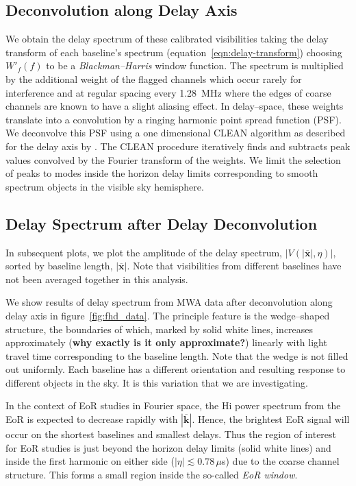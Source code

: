 \documentclass[preprint2,iop,numberedappendix]{emulateapj}
\begin{document}
\subsection{Deconvolution along Delay Axis}\label{sec:CLEAN}

We obtain the delay spectrum of these calibrated visibilities taking the delay transform of each baseline's spectrum (equation~\ref{eqn:delay-transform}) choosing $W'_f(f)$ to be a {\it Blackman--Harris} window function. The spectrum is multiplied by  the additional weight of the flagged channels which occur rarely for interference and at regular spacing every 1.28~MHz where the edges of coarse channels are known to have a slight aliasing effect. In delay--space, these weights translate into a convolution by a ringing harmonic point spread function (PSF). We deconvolve this PSF using a one dimensional CLEAN algorithm \citep{tay99} as described for the delay axis by \citet{par09,par12}. The CLEAN procedure iteratively finds and subtracts peak values convolved by the Fourier transform of the weights. We limit the selection of peaks to modes inside the horizon delay limits corresponding to smooth spectrum objects in the visible sky hemisphere.

\subsection{Delay Spectrum after Delay Deconvolution}\label{sec:data-delay-spectrum}

In subsequent plots, we plot the amplitude of the delay spectrum, $|V(|\overline{\mathbf{x}}|,\eta)|$, sorted by baseline length, $|\overline{\mathbf{x}}|$. Note that visibilities from different baselines have not been averaged together in this analysis. 

We show results of delay spectrum from MWA data after deconvolution along delay axis in figure~\ref{fig:fhd_data}. The principle feature is the wedge--shaped structure, the boundaries of which, marked by solid white lines, increases approximately ({\bf why exactly is it only approximate?}) linearly with light travel time corresponding to the baseline length. Note that the wedge is not filled out uniformly. Each baseline has a different orientation and resulting response to different objects in the sky. It is this variation that we are investigating. 

In the context of EoR studies in Fourier space, the H{\sc i} power spectrum from the EoR is expected to decrease rapidly with $|\overline{\mathbf{k}}|$. Hence, the brightest EoR signal will occur on the shortest baselines and smallest delays. Thus the region of interest for EoR studies is just beyond the horizon delay limits (solid white lines) and inside the first harmonic on either side ($|\eta| \lesssim 0.78\,\mu$s) due to the coarse channel structure. This forms a small region inside the so-called {\it EoR window}. 
\end{document}
